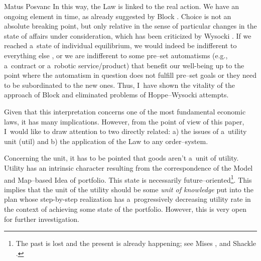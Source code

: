 \begin{artengenv}{Matus Posvanc}
In this way, the Law is linked to the real action. We have an ongoing element in time, as already suggested by Block 
\parencites*[][]{Block1980On}[][]{Block2009Rejoinder}. %
 Choice is not an absolute breaking point, but only relative in the sense of particular changes in the state of affairs under consideration, which has been criticized by Wysocki 
\parencite*[][]{Wysocki2021problem}. %
 If we reached a~state of individual equilibrium, we would indeed be indifferent to everything else 
\parencite[][]{Hoppe2005Must}, %
 or we are indifferent to some pre–set automatisms (e.g., a~contract or a~robotic service/product) that benefit our well-being up to the point where the automatism in question does not fulfill pre–set goals or they need to be subordinated to the new ones. Thus, I~have shown the vitality of the approach of Block 
\parencite*[][]{Block1980On} %
 and eliminated problems of Hoppe–Wysocki attempts.



Given that this interpretation concerns one of the most fundamental economic laws, it has many implications. However, from the point of view of this paper, I~would like to draw attention to two directly related: a) the issues of a~utility unit (util) and b) the application of the Law to any order–system.



Concerning the unit, it has to be pointed that goods aren't a~unit of utility. Utility has an intrinsic character resulting from the correspondence of the Model and Map–based Idea of portfolio. This state is necessarily future–oriented\footnote{The past is lost and the present is already happening; see Mises 
\parencite*[][]{Mises2014Theory}, %
 and Shackle 
\parencite*[][]{Shackle1992Epistemics}.%
}. This implies that the unit of the utility should be some \textit{unit of knowledge} put into the plan whose step-by-step realization has a~progressively decreasing utility rate in the context of achieving some state of the portfolio. However, this is very open for further investigation.




\end{artengenv}
